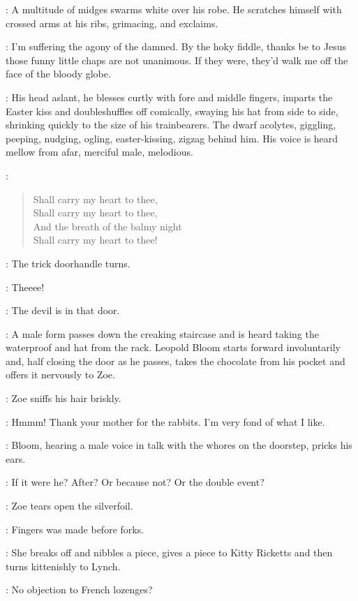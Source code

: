 :
A multitude of midges swarms white over his robe.
He scratches himself with crossed arms at his ribs, grimacing, and exclaims.

\Cardinal:
I'm suffering the agony of the damned.
By the hoky fiddle, thanks be to Jesus those funny little chaps are not unanimous.
If they were, they'd walk me off the face of the bloody globe.

:
His head aslant, he blesses curtly with fore and middle fingers,
imparts the Easter kiss and doubleshuffles off comically,
swaying his hat from side to side,
shrinking quickly to the size of his trainbearers.
The dwarf acolytes, giggling, peeping, nudging,
ogling, easter-kissing, zigzag behind him.
His voice is heard mellow from afar, merciful male, melodious.

\Cardinal:
\begin{verse}
    Shall carry my heart to thee,\\
    Shall carry my heart to thee,\\
%
    And the breath of the balmy night\\
    Shall carry my heart to thee!
\end{verse}

:
The trick doorhandle turns.

\Doorhandle:
Theeee!

\Zoe:
The devil is in that door.

:
A male form passes down the creaking staircase
and is heard taking the waterproof and hat from the rack.
Leopold Bloom starts forward involuntarily and,
half closing the door as he passes,
takes the chocolate from his pocket
%
and offers it nervously to Zoe.

:
Zoe sniffs his hair briskly.

\Zoe:
Hmmm!
Thank your mother for the rabbits.
I'm very fond of what I like.

:
Bloom, hearing a male voice in talk with the whores on the doorstep, pricks his ears.

\Bloom:
If it were he?
After?
Or because not?
Or the double event?

:
Zoe tears open the silverfoil.

\Zoe:
Fingers was made before forks.

:
She breaks off and nibbles a piece, gives a piece to Kitty Ricketts
and then turns kittenishly to Lynch.

\Zoe:
No objection to French lozenges?

